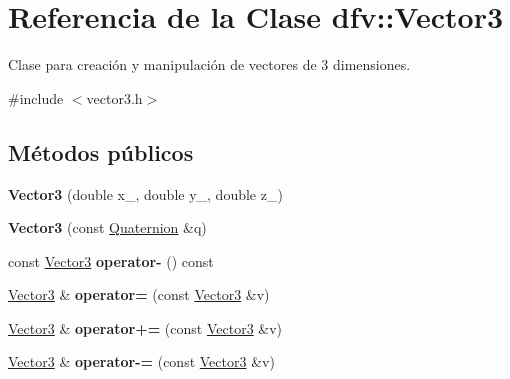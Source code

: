 \hypertarget{classdfv_1_1Vector3}{\section{\-Referencia de la \-Clase dfv\-:\-:\-Vector3}
\label{classdfv_1_1Vector3}
}


\-Clase para creación y manipulación de vectores de 3 dimensiones.  




{\ttfamily \#include $<$vector3.\-h$>$}

\subsection*{\-Métodos públicos}
\begin{DoxyCompactItemize}
\item 
\hypertarget{classdfv_1_1Vector3_a21f07d6bf0a461586477616965806dd5}{{\bfseries \-Vector3} (double x\-\_\-, double y\-\_\-, double z\-\_\-)}\label{classdfv_1_1Vector3_a21f07d6bf0a461586477616965806dd5}

\item 
\hypertarget{classdfv_1_1Vector3_a9a528496a7993aec718704d00de35347}{{\bfseries \-Vector3} (const \hyperlink{classdfv_1_1Quaternion}{\-Quaternion} \&q)}\label{classdfv_1_1Vector3_a9a528496a7993aec718704d00de35347}

\item 
\hypertarget{classdfv_1_1Vector3_a668590954b5b9c6a324f636bdd2775a9}{const \hyperlink{classdfv_1_1Vector3}{\-Vector3} {\bfseries operator-\/} () const }\label{classdfv_1_1Vector3_a668590954b5b9c6a324f636bdd2775a9}

\item 
\hypertarget{classdfv_1_1Vector3_aab1547319544b94bc6689c23c3db68c0}{\hyperlink{classdfv_1_1Vector3}{\-Vector3} \& {\bfseries operator=} (const \hyperlink{classdfv_1_1Vector3}{\-Vector3} \&v)}\label{classdfv_1_1Vector3_aab1547319544b94bc6689c23c3db68c0}

\item 
\hypertarget{classdfv_1_1Vector3_a2842350e49d2f110d9d9bf56e7af683a}{\hyperlink{classdfv_1_1Vector3}{\-Vector3} \& {\bfseries operator+=} (const \hyperlink{classdfv_1_1Vector3}{\-Vector3} \&v)}\label{classdfv_1_1Vector3_a2842350e49d2f110d9d9bf56e7af683a}

\item 
\hypertarget{classdfv_1_1Vector3_a3740cbf2cd166d4bf04f41368b3e8dbc}{\hyperlink{classdfv_1_1Vector3}{\-Vector3} \& {\bfseries operator-\/=} (const \hyperlink{classdfv_1_1Vector3}{\-Vector3} \&v)}\label{classdfv_1_1Vector3_a3740cbf2cd166d4bf04f41368b3e8dbc}


\end{DoxyCompactItemize}

